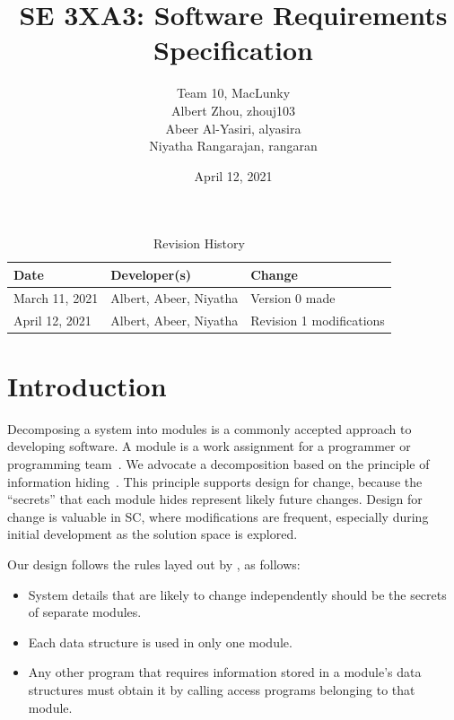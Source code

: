 \documentclass[12pt, titlepage]{article}
\title{SE 3XA3: Software Requirements Specification}
\author{Team 10, MacLunky
		\\ Albert Zhou, zhouj103
		\\Abeer Al-Yasiri, alyasira
		\\ Niyatha Rangarajan, rangaran
}
\date{April 12, 2021}
\begin{document}
\maketitle

\tableofcontents
\listoftables
\listoffigures

\begin{table}[hp]
\caption{Revision History} \label{TblRevisionHistory}
\begin{tabularx}{\textwidth}{llX}
\toprule
\textbf{Date} & \textbf{Developer(s)} & \textbf{Change}\\
\midrule
March 11, 2021 & Albert, Abeer, Niyatha & Version 0 made\\
\midrule
April 12, 2021 & Albert, Abeer, Niyatha & Revision 1 modifications\\
\bottomrule
\end{tabularx}
\end{table}


\newpage


\section{Introduction}

Decomposing a system into modules is a commonly accepted approach to developing
software.  A module is a work assignment for a programmer or programming
team~\citep{ParnasEtAl1984}.  We advocate a decomposition
based on the principle of information hiding~\citep{Parnas1972a}.  This
principle supports design for change, because the ``secrets'' that each module
hides represent likely future changes.  Design for change is valuable in SC,
where modifications are frequent, especially during initial development as the
solution space is explored.  

Our design follows the rules layed out by \citet{ParnasEtAl1984}, as follows:
\begin{itemize}
\item System details that are likely to change independently should be the
  secrets of separate modules.
\item Each data structure is used in only one module.
\item Any other program that requires information stored in a module's data
  structures must obtain it by calling access programs belonging to that module.
\end{itemize}
\end{document}
